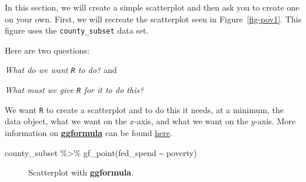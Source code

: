 \documentclass[
  letterpaper,
  DIV=11,
  numbers=noendperiod]{scrreprt}
\newenvironment{Shaded}{\begin{snugshade}}{\end{snugshade}}
\newcommand{\FunctionTok}[1]{\textcolor[rgb]{0.28,0.35,0.67}{#1}}
\newcommand{\NormalTok}[1]{\textcolor[rgb]{0.00,0.23,0.31}{#1}}
\newcommand{\SpecialCharTok}[1]{\textcolor[rgb]{0.37,0.37,0.37}{#1}}
\begin{document}
In this section, we will create a simple scatterplot and then ask you to
create one on your own. First, we will recreate the scatterplot seen in
Figure~\ref{fig-pov1}. This figure uses the \texttt{county\_subset} data
set.

Here are two questions:

\emph{What do we want \texttt{R} to do?} and

\emph{What must we give \texttt{R} for it to do this?}

We want \texttt{R} to create a scatterplot and to do this it needs, at a
minimum, the data object, what we want on the \(x\)-axis, and what we
want on the \(y\)-axis. More information on
\href{https://cran.r-project.org/web/packages/ggformula/vignettes/ggformula.html}{\textbf{ggformula}}
can be found
\href{https://cran.r-project.org/web/packages/ggformula/vignettes/ggformula-blog.html}{here}.

\begin{Shaded}
\begin{Highlighting}[]
\NormalTok{county\_subset }\SpecialCharTok{\%\textgreater{}\%}
  \FunctionTok{gf\_point}\NormalTok{(fed\_spend }\SpecialCharTok{\textasciitilde{}}\NormalTok{ poverty)}
\end{Highlighting}
\end{Shaded}

\begin{figure}[H]


\caption{\label{fig-pov2}Scatterplot with \textbf{ggformula}.}

\end{figure}%
\end{document}
